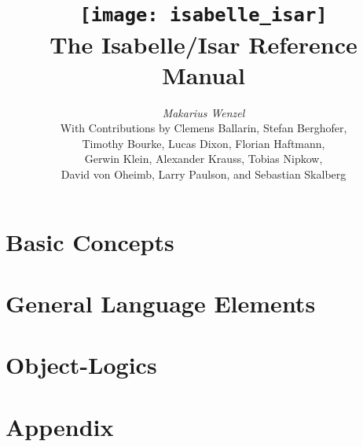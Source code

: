 \documentclass[12pt,a4paper,fleqn]{report}
\title{\texttt{[image: isabelle\_isar]} \\[4ex] The Isabelle/Isar Reference Manual}
\author{\emph{Makarius Wenzel} \\[3ex]
  With Contributions by
  Clemens Ballarin,
  Stefan Berghofer, \\
  Timothy Bourke,
  Lucas Dixon,
  Florian Haftmann, \\
  Gerwin Klein,
  Alexander Krauss,
  Tobias Nipkow, \\
  David von Oheimb,
  Larry Paulson,
  and Sebastian Skalberg
}
\let\intorig=\int  %
\begin{document}
\maketitle 

{\def\isamarkupchapter#1{\chapter*{#1}}}
\tableofcontents
\clearfirst

\part{Basic Concepts}


\part{General Language Elements}







\part{Object-Logics}




\part{Appendix}
\appendix

\let\int\intorig



\begingroup
   \small\raggedright\frenchspacing
  
\endgroup

\printindex
\end{document}
